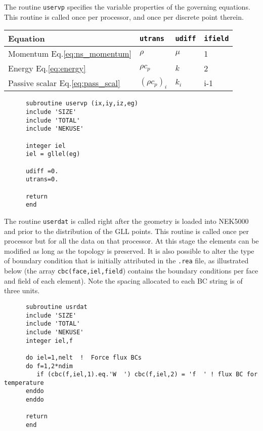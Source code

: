 The routine {\tt uservp} specifies the variable properties of the governing equations.
This routine is called once per processor, and once per discrete point therein. 
\\

\begin{tabular}{ l|l|l|l }
   \hline
   Equation & {\tt utrans} & {\tt udiff} & {\tt ifield} \\ \hline \hline
   Momentum Eq.\ref{eq:ns_momentum} & \(\rho\) & \(\mu\) & 1 \\ 
   Energy Eq.\ref{eq:energy} & \(\rho c_p\) & \(k\) & 2\\ 
   Passive scalar Eq.\ref{eq:pass_scal} &\((\rho c_p)_i\) & \(k_i\)& i-1\\
   \hline
\end{tabular}


\begin{lstlisting}
      subroutine uservp (ix,iy,iz,eg)
      include 'SIZE'
      include 'TOTAL'
      include 'NEKUSE'
      
      integer iel
      iel = gllel(eg)

      udiff =0.
      utrans=0.
      
      return
      end
\end{lstlisting}

The routine {\tt userdat} is called right after the geometry is loaded into NEK5000 and prior to the distribution of the GLL points. This routine is called once per processor but for all the data on that processor. At this stage the elements can be modified as long as the topology is preserved. It is also possible to alter the type of boundary condition that is initially attributed in the {\tt .rea} file, as illustrated below (the array {\tt cbc(face,iel,field}) contains the boundary conditions per face and field of each element). Note the spacing allocated to each BC string is of three units.

\begin{lstlisting}
      subroutine usrdat
      include 'SIZE'
      include 'TOTAL'
      include 'NEKUSE'
      integer iel,f

      do iel=1,nelt  !  Force flux BCs
      do f=1,2*ndim
         if (cbc(f,iel,1).eq.'W  ') cbc(f,iel,2) = 'f  ' ! flux BC for temperature
      enddo
      enddo
   
      return
      end
\end{lstlisting}

